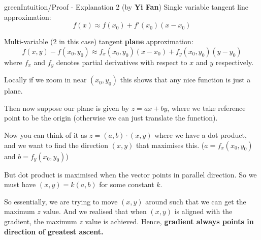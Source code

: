 \documentclass[12pt,a4paper]{extreport}
\numberwithin{equation}{chapter}
\begin{document}
            \begin{mybox}{green}{Intuition/Proof - Explanation 2 (by \textbf{Yi Fan})}
                Single variable tangent line approximation:
                \begin{equation}
                    f(x)\approx f(x_0)+ f'(x_0)(x-x_0)
                \end{equation}
                
                Multi-variable (2 in this case) tangent \textbf{plane} approximation:
                \begin{equation}
                     f(x,y)-f(x_0,y_0) \approx f_x(x_0,y_0)(x-x_0) + f_y(x_0,y_0)(y-y_0)
                \end{equation}
                where $f_x$ and $f_y$ denotes partial derivatives with respect to $x$ and $y$ respectively. 
                
                \begin{flushleft}
                    Locally if we zoom in near $(x_0, y_0)$ this shows that any nice function is just a plane.
                \end{flushleft}
                \begin{flushleft}
                    Then now suppose our plane is given by $z = ax + by$, where we take reference point to be the origin (otherwise we can just translate the function).
                \end{flushleft}
                \begin{flushleft}
                    Now you can think of it as $z = (a,b)\cdot (x,y)$ where we have a dot product, and we want to find the direction $(x,y)$ that maximises this. ($a = f_x(x_0, y_0)$ and $b = f_y(x_0,y_0)$)   
                \end{flushleft}
                \begin{flushleft}
                    But dot product is maximised when the vector points in parallel direction. So we must have $(x,y) = k(a,b)$ for some constant $k$.
                \end{flushleft}
                \begin{flushleft}
                    So essentially, we are trying to move $(x,y)$ around such that we can get the maximum $z$ value. And we realised that when $(x,y)$ is aligned with the gradient, the maximum $z$ value is achieved. Hence, \textbf{gradient always points in direction of greatest ascent.}
                \end{flushleft}
               
            \end{mybox}
            
\end{document}
